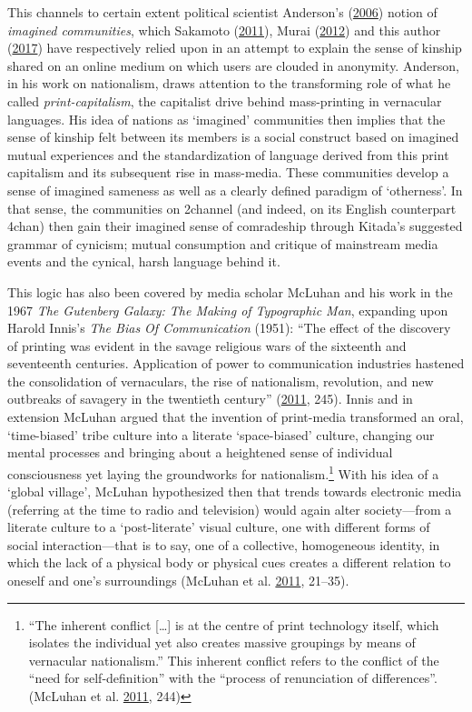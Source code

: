 \documentclass[10pt,british,A4paper,,openany]{memoir}
\begin{document}
This channels to certain extent political scientist Anderson's
(\protect\hyperlink{ref-anderson_imagined_2006}{2006}) notion of
\emph{imagined communities}, which Sakamoto
(\protect\hyperlink{ref-sakamoto_koreans_2011}{2011}), Murai
(\protect\hyperlink{ref-murai_net_2012}{2012}) and this author
(\protect\hyperlink{ref-poppe_digitaal_2017}{2017}) have respectively
relied upon in an attempt to explain the sense of kinship shared on an
online medium on which users are clouded in anonymity. Anderson, in his
work on nationalism, draws attention to the transforming role of what he
called \emph{print-capitalism}, the capitalist drive behind
mass-printing in vernacular languages. His idea of nations as `imagined'
communities then implies that the sense of kinship felt between its
members is a social construct based on imagined mutual experiences and
the standardization of language derived from this print capitalism and
its subsequent rise in mass-media. These communities develop a sense of
imagined sameness as well as a clearly defined paradigm of `otherness'.
In that sense, the communities on 2channel (and indeed, on its English
counterpart 4chan) then gain their imagined sense of comradeship through
Kitada's suggested grammar of cynicism; mutual consumption and critique
of mainstream media events and the cynical, harsh language behind it.

This logic has also been covered by media scholar McLuhan and his work
in the 1967 \emph{The Gutenberg Galaxy: The Making of Typographic Man},
expanding upon Harold Innis's \emph{The Bias Of Communication} (1951):
``The effect of the discovery of printing was evident in the savage
religious wars of the sixteenth and seventeenth centuries. Application
of power to communication industries hastened the consolidation of
vernaculars, the rise of nationalism, revolution, and new outbreaks of
savagery in the twentieth century''
(\protect\hyperlink{ref-mcluhan_gutenberg_2011}{2011}, 245). Innis and
in extension McLuhan argued that the invention of print-media
transformed an oral, `time-biased' tribe culture into a literate
`space-biased' culture, changing our mental processes and bringing about
a heightened sense of individual consciousness yet laying the
groundworks for nationalism.\footnote{``The inherent conflict
  {[}\ldots{}{]} is at the centre of print technology itself, which
  isolates the individual yet also creates massive groupings by means of
  vernacular nationalism.'' This inherent conflict refers to the
  conflict of the ``need for self-definition'' with the ``process of
  renunciation of differences''. (McLuhan et al.
  \protect\hyperlink{ref-mcluhan_gutenberg_2011}{2011}, 244)} With his
idea of a `global village', McLuhan hypothesized then that trends
towards electronic media (referring at the time to radio and television)
would again alter society---from a literate culture to a `post-literate'
visual culture, one with different forms of social interaction---that is
to say, one of a collective, homogeneous identity, in which the lack of
a physical body or physical cues creates a different relation to oneself
and one's surroundings (McLuhan et al.
\protect\hyperlink{ref-mcluhan_gutenberg_2011}{2011}, 21--35).
\end{document}
